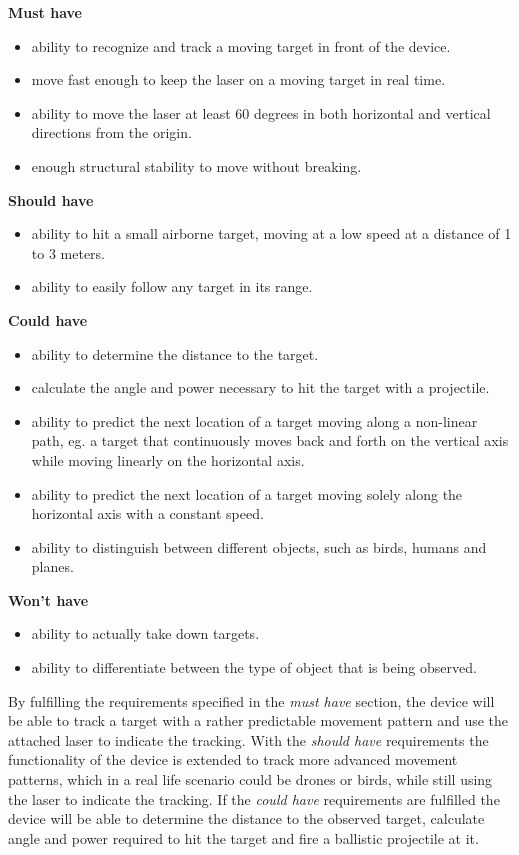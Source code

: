 
\textbf{Must have}
\begin{itemize}
	\item ability to recognize and track a moving target in front of the device.
	\item move fast enough to keep the laser on a moving target in real time.
	\item ability to move the laser at least 60 degrees in both horizontal and vertical directions from the origin.
	\item enough structural stability to move without breaking.
\end{itemize}

\textbf{Should have}
\begin{itemize}
	\item ability to hit a small airborne target, moving at a low speed at a distance of 1 to 3 meters.
	\item ability to easily follow any target in its range.
	
\end{itemize}

\textbf{Could have}
\begin{itemize}
	\item ability to determine the distance to the target.
	\item calculate the angle and power necessary to hit the target with a projectile.
	\item ability to predict the next location of a target moving along a non-linear path, eg{.} a target that continuously moves back and forth on the vertical axis while moving linearly on the horizontal axis.
	\item ability to predict the next location of a target moving solely along the horizontal axis with a constant speed.
	\item ability to distinguish between different objects, such as birds, humans and planes.
\end{itemize}

\textbf{Won't have}
\begin{itemize}
	\item ability to actually take down targets.
	\item ability to differentiate between the type of object that is being observed.
\end{itemize}

By fulfilling the requirements specified in the \textit{must have} section, the device will be able to track a target with a rather predictable movement pattern and use the attached laser to indicate the tracking.
With the \textit{should have} requirements the functionality of the device is extended to track more advanced movement patterns, which in a real life scenario could be drones or birds, while still using the laser to indicate the tracking.
If the \textit{could have} requirements are fulfilled the device will be able to determine the distance to the observed target, calculate angle and power required to hit the target and fire a ballistic projectile at it.

